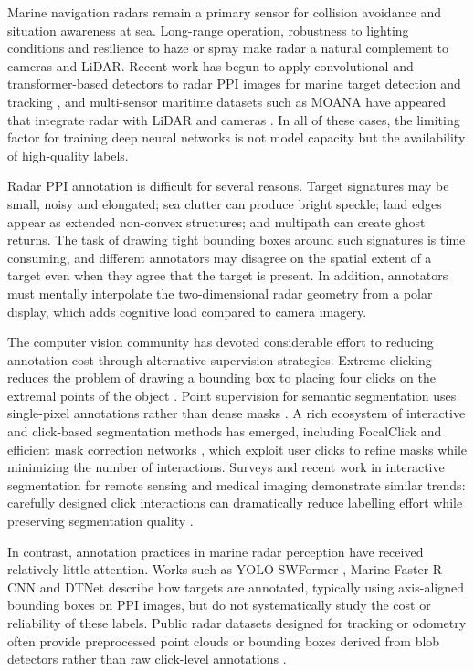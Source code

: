 \documentclass[twocolumn, 10pt]{article}
\begin{document}
Marine navigation radars remain a primary sensor for collision avoidance and situation awareness at sea. Long-range operation, robustness to lighting conditions and resilience to haze or spray make radar a natural complement to cameras and LiDAR. Recent work has begun to apply convolutional and transformer-based detectors to radar PPI images for marine target detection and tracking \cite{Zhang2023YoloSwformer,Chen2022MarineFasterRCNN,He2025DTNet}, and multi-sensor maritime datasets such as MOANA have appeared that integrate radar with LiDAR and cameras \cite{Jang2025MOANA}. In all of these cases, the limiting factor for training deep neural networks is not model capacity but the availability of high-quality labels.

Radar PPI annotation is difficult for several reasons. Target signatures may be small, noisy and elongated; sea clutter can produce bright speckle; land edges appear as extended non-convex structures; and multipath can create ghost returns. The task of drawing tight bounding boxes around such signatures is time consuming, and different annotators may disagree on the spatial extent of a target even when they agree that the target is present. In addition, annotators must mentally interpolate the two-dimensional radar geometry from a polar display, which adds cognitive load compared to camera imagery.

The computer vision community has devoted considerable effort to reducing annotation cost through alternative supervision strategies. Extreme clicking reduces the problem of drawing a bounding box to placing four clicks on the extremal points of the object \cite{Papadopoulos2017Extreme}. Point supervision for semantic segmentation uses single-pixel annotations rather than dense masks \cite{Bearman2016Whats}. A rich ecosystem of interactive and click-based segmentation methods has emerged, including FocalClick \cite{Chen2022FocalClick} and efficient mask correction networks \cite{Du2023EfficientMask}, which exploit user clicks to refine masks while minimizing the number of interactions. Surveys and recent work in interactive segmentation for remote sensing and medical imaging demonstrate similar trends: carefully designed click interactions can dramatically reduce labelling effort while preserving segmentation quality \cite{Qian2023BoundaryClick,Shi2025IMedSeg,Chen2024RemoteSensingInteractive}.

In contrast, annotation practices in marine radar perception have received relatively little attention. Works such as YOLO-SWFormer \cite{Zhang2023YoloSwformer}, Marine-Faster R-CNN \cite{Chen2022MarineFasterRCNN} and DTNet \cite{He2025DTNet} describe how targets are annotated, typically using axis-aligned bounding boxes on PPI images, but do not systematically study the cost or reliability of these labels. Public radar datasets designed for tracking or odometry often provide preprocessed point clouds or bounding boxes derived from blob detectors rather than raw click-level annotations \cite{DLRTrackingRadar,Jang2025MOANA,datasetMRadar}.
\end{document}
